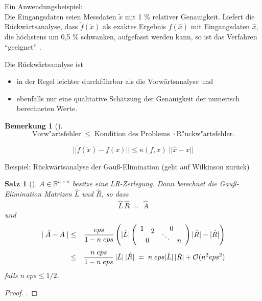 \documentclass[ngerman,fontsize=11pt, paper=a4, parskip=half, titlepage=true, toc=bib]{scrbook}
\theoremstyle{definition}
\newtheorem{Bem}[Def]{Bemerkung}	%
\theoremstyle{plain}
\newtheorem{Satz}[Def]{Satz}		%
\newcommand{\R}{\mathds{R}}
\newcommand{\subsectione}[1]{\addtocounter{Def}{1}\subsection{#1}}
\newenvironment{Satze}[1][]{ %
  \begin{Satz}[#1]
  }
  {
  \end{Satz}
  \addtocounter{subsection}{1}
}
\newenvironment{Beme}[1][]{ %
  \begin{Bem}[#1]
  }
  {
  \end{Bem}
  \addtocounter{subsection}{1}
}
\begin{document}
Ein Anwendungsbeispiel:\\
Die Eingangsdaten seien Messdaten $\tilde{x}$  mit 1 \% relativer Genauigkeit. 
Liefert die Rückwärtsanalyse, dass $\tilde{f} (\tilde{x})$ als exaktes Ergebnis 
$f(\hat x)$ mit Eingangsdaten $\hat x$, 
die höchstens um 0,5 \% schwanken, aufgefasst werden kann,
so ist das Verfahren \enquote{geeignet} . 

Die Rückwärtsanalyse ist
\begin{itemize}
\item in der Regel leichter durchführbar als die
  Vorwärtsanalyse  und 
\item ebenfalls nur eine qualitative Schätzung der
  Genauigkeit der numerisch berechneten Werte.
\end{itemize}

\begin{Beme}
  $$ \mbox{Vorw"artsfehler} \; \leq \; \mbox{Kondition des
    Problems } \cdot \mbox{R"uckw"artsfehler} .$$
  
  $$ ||\tilde f (\tilde x)  - f(x)|| \leq \kappa (f,x) \; || \hat x -x|| $$
  
  Beispiel: Rückwärtsanalyse der Gauß-Elimination
  (geht auf Wilkinson zurück)
\end{Beme}


\begin{Satze}
  $A \in \R^{n\times n}$ besitze eine LR-Zerlegung. Dann berechnet die
  Gauß-Elimination Matrizen $\hat{L}$ und $\hat{R}$,
  so dass
  \begin{gather*}\hat{L}\,\hat{R}\; = \;\hat{A}\end{gather*}
  und
  \begin{align*}
    \mid \hat{ A}-A\mid & \leq 
    & \frac{eps}{1 -n \;eps}
      \left( | \hat{ L} | 
      \left( \begin{array}{cccc}
               1 && \multicolumn{2}{c}{0}\\[-2ex]&2
                                                 &&\\[-2ex]
                 &&\ddots & \\[-2ex]  \multicolumn{2}{c}{0}&&n
             \end{array} \right)
                                                              |\hat{R}|
                                                              -|\hat{R}|
                                                              \right)
    \\[1ex]
                        & \leq & \frac{n\;eps}{1-n\;eps}\,|\hat{L}|\,|\hat{R}|\; 
                                 =\;n\;eps|\hat{L}|\,|\hat{R}| +
                                 \mathcal{O}( n^2 eps^2)
  \end{align*}
  falls $n\;eps \leq 1/2$.
\end{Satze}
\begin{proof}
  \cite[siehe][]{stoerbulirsch}.
\end{proof}
\end{document}
